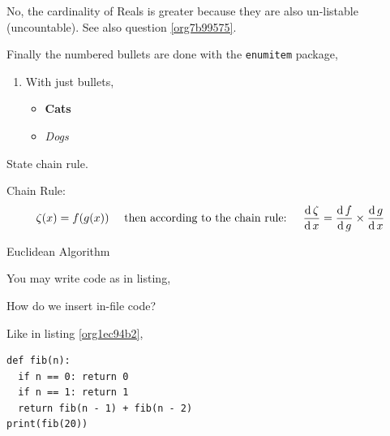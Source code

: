 \documentclass{homework}
\begin{document}
No, the cardinality of Reals is greater because they are also un-listable (uncountable). See also question \ref{org7b99575}.

\question Finally the numbered bullets are done with the \texttt{enumitem} package,
\label{sec:org9517362}

\begin{enumerate}
\item With just bullets,
\begin{itemize}
\item \textbf{Cats}
\item \emph{Dogs}
\end{itemize}
\end{enumerate}

\question [1 (Bonus)] State chain rule.
\label{sec:org7d09f1a}

Chain Rule:
\[
\zeta(x) = f(g(x)) \quad \text{ then according to the chain rule: } \quad
\derivative{\zeta} = \derivative[g]{f} \times \derivative{g}
\]

\question [2 (Bonus)] Euclidean Algorithm
\label{sec:org27a9b87}

You may write code as in listing,



\question How do we insert in-file code?
\label{sec:orgede3ada}

Like in listing \ref{org1ec94b2},

\begin{lstlisting}
def fib(n):
  if n == 0: return 0
  if n == 1: return 1
  return fib(n - 1) + fib(n - 2)
print(fib(20))
\end{lstlisting}




\end{document}
